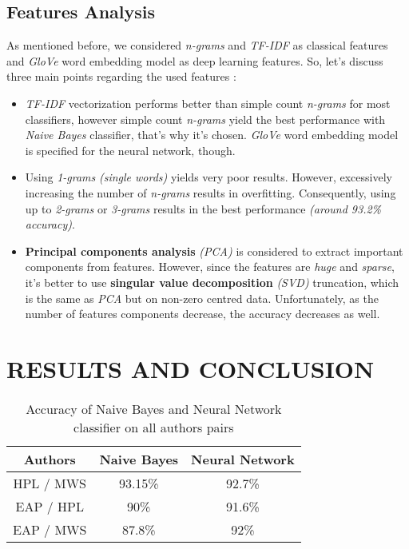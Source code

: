 \documentclass[letterpaper, 10 pt, conference]{ieeeconf}  %
\begin{document}
\subsection{Features Analysis}
As mentioned before, we considered \emph{n-grams} and \emph{TF-IDF} as classical features and \emph{GloVe} word embedding model as deep learning features. So, let's discuss three main points regarding the used features :
\begin{itemize}
    \item \emph{TF-IDF} vectorization performs better than simple count \emph{n-grams} for most classifiers, however simple count \emph{n-grams} yield the best performance with \emph{Naive Bayes} classifier, that's why it's chosen. \emph{GloVe} word embedding model is specified for the neural network, though.
    \item Using \emph{1-grams} \emph{(single words)} yields very poor results. However, excessively increasing the number of \emph{n-grams} results in overfitting. Consequently, using up to \emph{2-grams} or \emph{3-grams} results in the best performance \emph{(around 93.2\% accuracy)}.
    \item \textbf{Principal components analysis} \emph{(PCA)} is considered to extract important components from features. However, since the features are \emph{huge} and \emph{sparse}, it's better to use \textbf{singular value decomposition} \emph{(SVD)} truncation, which is the same as \emph{PCA} but on non-zero centred data. Unfortunately, as the number of features components decrease, the accuracy decreases as well.
\end{itemize}


\section{RESULTS AND CONCLUSION}
\begin{table}[h!]
\centering
\begin{tabular}{||c | c | c ||} 
 \hline
 Authors & Naive Bayes & Neural Network \\ [0.5ex] 
 \hline\hline
 HPL / MWS & 93.15\% & 92.7\% \\ 
 \hline
 EAP / HPL & 90\% & 91.6\% \\
 \hline
 EAP / MWS & 87.8\% & 92\% \\
 \hline
\end{tabular}
\caption{Accuracy of Naive Bayes and Neural Network classifier on all authors pairs}
\label{table:3}
\end{table}
\end{document}
